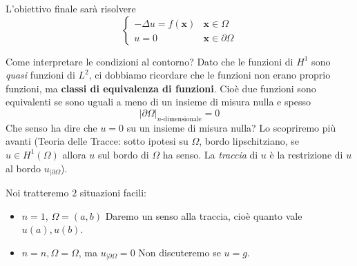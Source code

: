 \documentclass[10pt,a4paper,twoside,openright]{book}
\begin{document}
L'obiettivo finale sarà risolvere
\begin{equation*}
	\begin{cases}
		-\Delta u=f(\mathbf{x}) & \mathbf{x} \in \Omega          \\
		u=0                     & \mathbf{x} \in \partial \Omega 
	\end{cases}
\end{equation*}
\begin{oss}
	Come interpretare le condizioni al contorno? Dato che le funzioni di $H^{1}$ sono \textit{quasi} funzioni di $L^{2}$, ci dobbiamo ricordare che le funzioni non erano proprio funzioni, ma \textbf{classi di equivalenza di funzioni}. Cioè due funzioni sono equivalenti se sono uguali a meno di un insieme di misura nulla e spesso
	\begin{equation*}
		| \partial \Omega | _{n\text{-dimensionale}} =0
	\end{equation*}
	Che senso ha dire che $u=0$ su un insieme di misura nulla? Lo scopriremo più avanti (Teoria delle Tracce: sotto ipotesi su $\Omega $, bordo lipschitziano, se $u\in H^{1}( \Omega )$ allora $u$ sul bordo di $\Omega $ ha senso. La \textit{traccia} di $u$ è la restrizione di $u$ al bordo $u_{|\partial \Omega }$).
\end{oss}
Noi tratteremo $2$ situazioni facili:
\begin{itemize}
	\item $n=1$, $\Omega =( a,b)$
	      Daremo un senso alla traccia, cioè quanto vale $u( a) ,u( b)$.
	\item $n=n,\Omega =\Omega $, ma $u_{|\partial \Omega } =0$
	      Non discuteremo se $u=g$.
\end{itemize}
\end{document}
